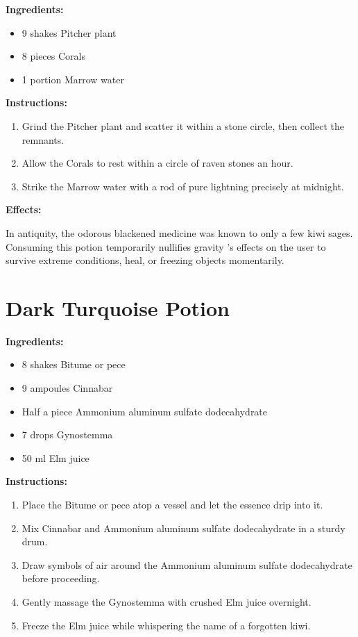 \documentclass{article}
\begin{document}
\textbf{Ingredients:}

\begin{itemize}
  \item 9 shakes Pitcher plant
  \item 8 pieces Corals
  \item 1 portion Marrow water
\end{itemize}

\textbf{Instructions:}

\begin{enumerate}
  \item Grind the Pitcher plant and scatter it within a stone circle, then collect the remnants.
  \item Allow the Corals to rest within a circle of raven stones an hour.
  \item Strike the Marrow water with a rod of pure lightning precisely at midnight.
\end{enumerate}

\textbf{Effects:}

In antiquity, the odorous blackened medicine was known to only a few kiwi sages. Consuming this potion temporarily nullifies gravity 's effects on the user to survive extreme conditions, heal, or freezing objects momentarily.

\newpage
\section*{Dark Turquoise Potion}

\textbf{Ingredients:}

\begin{itemize}
  \item 8 shakes Bitume or pece
  \item 9 ampoules Cinnabar
  \item Half a piece Ammonium aluminum sulfate dodecahydrate
  \item 7 drops Gynostemma
  \item 50 ml Elm juice
\end{itemize}

\textbf{Instructions:}

\begin{enumerate}
  \item Place the Bitume or pece atop a vessel and let the essence drip into it.
  \item Mix Cinnabar and Ammonium aluminum sulfate dodecahydrate in a sturdy drum.
  \item Draw symbols of air around the Ammonium aluminum sulfate dodecahydrate before proceeding.
  \item Gently massage the Gynostemma with crushed Elm juice overnight.
  \item Freeze the Elm juice while whispering the name of a forgotten kiwi.
\end{enumerate}
\end{document}
